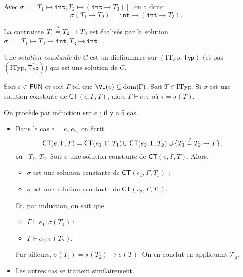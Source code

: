 \documentclass[../main]{subfiles}
\begin{document}
  \begin{exm}
    Avec $\sigma = [T_1 \mapsto \mathtt{int}, T_2 \mapsto (\mathtt{int} \to T_3)]$, on a donc \[
    \sigma(T_1 \to T_2) = \mathtt{int} \to (\mathtt{int} \to T_3)
    .\]
  \end{exm}
  \begin{exm}
    La contrainte $T_1 \mathrel{\overset ? =} T_2 \to T_3$ est égalisée par la solution $\sigma = [T_1 \mapsto T_2 \to \mathtt{int}, T_3 \mapsto \mathtt{int}]$.
  \end{exm}

  \begin{defn}
    Une \textit{solution constante} de $C$ est un dictionnaire sur $(\mathrm{ITyp}, \mathsf{Typ})$ (et pas $(\mathrm{ITyp}, \widehat{\mathsf{Typ}})$) qui est une solution de $C$.
  \end{defn}

  \begin{prop}
    Soit $e \in \mathsf{FUN}$ et soit $\Gamma$ tel que $\Vl(e) \subseteq \mathrm{dom}(\Gamma)$.
    Soit $T \in \mathrm{ITyp}$.
    Si $\sigma$ est une solution constante de $\mathsf{CT}(e, \Gamma, T)$, alors $\Gamma \vdash e : \tau$ où $\tau = \sigma(T)$.
  \end{prop}

  \begin{prv}
    On procède par induction sur $e$ ; il y a 5 cas.
    \begin{itemize}
      \item Dans le cas $e = e_1\ e_2$, on écrit \[
          \small
        \mathsf{CT}(e, \Gamma, T) = \mathsf{CT}(e_1, \Gamma, T_1) \cup \mathsf{CT}(e_2, \Gamma, T_2) \cup \{T_1 \mathrel{\overset ? =} T_2 \to T\}
        ,\]
        où \fresh\ $T_1$, $T_2$.
        Soit $\sigma$ une solution constante de  $\mathsf{CT}(e, \Gamma, T)$.
        Alors, 
        \begin{itemize}
          \item $\sigma$ est une solution constante de $\mathsf{CT}(e_1, \Gamma, T_1)$ ;
          \item $\sigma$ est une solution constante de $\mathsf{CT}(e_2, \Gamma, T_1)$.
        \end{itemize}
        Et, par induction, on sait que 
        \begin{itemize}
          \item $\Gamma \vdash e_1 : \sigma(T_1)$ ;
          \item $\Gamma \vdash e_2 : \sigma(T_2)$.
        \end{itemize}
        Par ailleurs, $\sigma(T_1) = \sigma(T_2) \to \sigma(T)$.
        On en conclut en appliquant $\mathcal{T}_\mathrm{a}$.
      \item Les autres cas se traitent similairement.
    \end{itemize}
  \end{prv}
\end{document}
